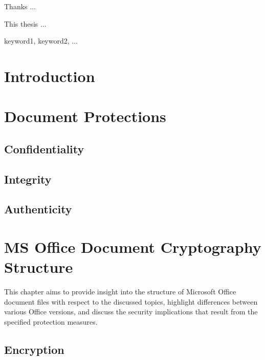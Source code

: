 \documentclass[11pt,oneside]{fithesis2}
\begin{document}
\FrontMatter
\ThesisTitlePage

\begin{ThesisDeclaration}
\DeclarationText
\AdvisorName
\end{ThesisDeclaration}

\begin{ThesisThanks}
Thanks ...
\end{ThesisThanks}

\begin{ThesisAbstract}
This thesis ...  
\end{ThesisAbstract}

\begin{ThesisKeyWords}
keyword1, keyword2, ...
\end{ThesisKeyWords}

\MainMatter

\tableofcontents 
\chapter{Introduction}

\chapter{Document Protections}

\section{Confidentiality}

\section{Integrity}

\section{Authenticity}

\chapter{MS Office Document Cryptography Structure}

This chapter aims to provide insight into the structure of Microsoft Office document files with respect to the discussed topics, highlight differences between various Office versions, and discuss the security implications that result from the specified protection measures.

\section{Encryption} 
\end{document}
